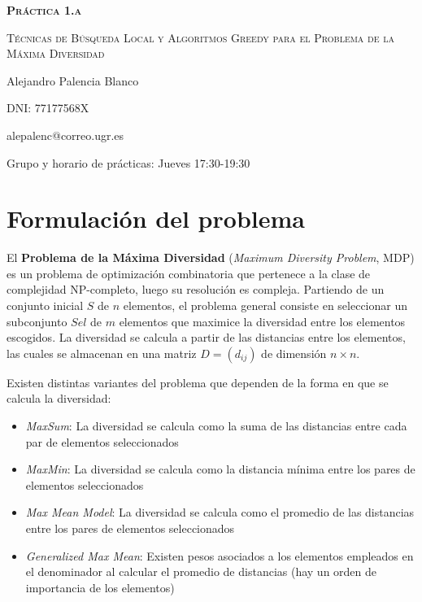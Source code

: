 \documentclass[10pt,a4paper]{article}
\begin{document}
\begin{titlepage}
	\centering
	{\bfseries\scshape\Huge Práctica 1.a \par}
	\vspace{3cm}
	{\scshape\Huge Técnicas de Búsqueda Local y Algoritmos Greedy para el Problema de la Máxima Diversidad \par}
	\vfill
	{\Large Alejandro Palencia Blanco \par}
	\vspace{1cm}
	{\Large DNI: 77177568X \par}
	\vspace{1cm}
	{\Large alepalenc@correo.ugr.es \par}
	\vspace{1cm}
	\vfill
	{\Large Grupo y horario de prácticas: Jueves 17:30-19:30 \par}
\end{titlepage}

\newpage

\tableofcontents

\newpage

\section{Formulación del problema}

El \textbf{Problema de la Máxima Diversidad} (\textit{Maximum Diversity Problem}, MDP) es un problema de optimización combinatoria que pertenece a la clase de complejidad NP-completo, luego su resolución es compleja. Partiendo de un conjunto inicial $S$ de $n$ elementos, el problema general consiste en seleccionar un subconjunto $Sel$ de $m$ elementos que maximice la diversidad entre los elementos escogidos. La diversidad se calcula a partir de las distancias entre los elementos, las cuales se almacenan en una matriz $D = (d_{ij})$ de dimensión $n \times n$.

Existen distintas variantes del problema que dependen de la forma en que se calcula la diversidad:

\begin{itemize}
	\item \textit{MaxSum}: La diversidad se calcula como la suma de las
	distancias entre cada par de elementos seleccionados
	\item \textit{MaxMin}: La diversidad se calcula como la distancia
	mínima entre los pares de elementos seleccionados
	\item \textit{Max Mean Model}: La diversidad se calcula como el promedio de
	las distancias entre los pares de elementos seleccionados
	\item \textit{Generalized Max Mean}: Existen pesos asociados a los elementos
	empleados en el denominador al calcular el promedio de
	distancias (hay un orden de importancia de los elementos)
\end{itemize}
\end{document}
